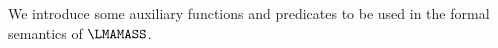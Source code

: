 We introduce some auxiliary functions and predicates to be used in the formal semantics of $\LMAMASS$.

	
